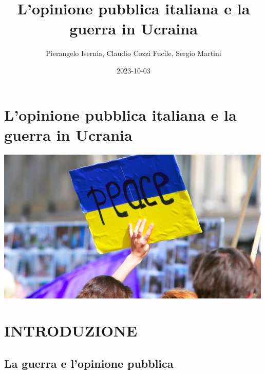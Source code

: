 \documentclass[
]{book}
\title{L'opinione pubblica italiana e la guerra in Ucraina}
\author{Pierangelo Isernia, Claudio Cozzi Fucile, Sergio Martini}
\date{2023-10-03}
\begin{document}
\maketitle

{
\setcounter{tocdepth}{1}
\tableofcontents
}
\hypertarget{lopinione-pubblica-italiana-e-la-guerra-in-ucrania}{%
\chapter*{L'opinione pubblica italiana e la guerra in Ucrania}\label{lopinione-pubblica-italiana-e-la-guerra-in-ucrania}}

\includegraphics{Images/Ucrania.jpeg}

\hypertarget{introduzione}{%
\chapter{INTRODUZIONE}\label{introduzione}}

\hypertarget{la-guerra-e-lopinione-pubblica}{%
\section{La guerra e l'opinione pubblica}\label{la-guerra-e-lopinione-pubblica}}
\end{document}
